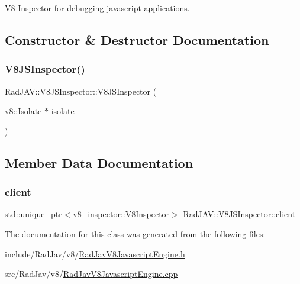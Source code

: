 V8 Inspector for debugging javascript applications. 

\subsection{Constructor \& Destructor Documentation}
\mbox{\label{class_rad_j_a_v_1_1_v8_j_s_inspector_a47fc1dc7067a49100c48a760ed7e288d}} 
\subsubsection{\texorpdfstring{V8\+J\+S\+Inspector()}{V8JSInspector()}}
{\footnotesize\ttfamily Rad\+J\+A\+V\+::\+V8\+J\+S\+Inspector\+::\+V8\+J\+S\+Inspector (\begin{DoxyParamCaption}\item[{v8\+::\+Isolate $\ast$}]{isolate }\end{DoxyParamCaption})}



\subsection{Member Data Documentation}
\mbox{\label{class_rad_j_a_v_1_1_v8_j_s_inspector_aef379a913b0a7ffb9d66e59d91d8e5f5}} 
\subsubsection{\texorpdfstring{client}{client}}
{\footnotesize\ttfamily std\+::unique\+\_\+ptr$<$v8\+\_\+inspector\+::\+V8\+Inspector$>$ Rad\+J\+A\+V\+::\+V8\+J\+S\+Inspector\+::client\hspace{0.3cm}{\ttfamily [protected]}}



The documentation for this class was generated from the following files\+:\begin{DoxyCompactItemize}
\item 
include/\+Rad\+Jav/v8/\mbox{\hyperlink{_rad_jav_v8_javascript_engine_8h}{Rad\+Jav\+V8\+Javascript\+Engine.\+h}}\item 
src/\+Rad\+Jav/v8/\mbox{\hyperlink{v8_2_rad_jav_v8_javascript_engine_8cpp}{Rad\+Jav\+V8\+Javascript\+Engine.\+cpp}}\end{DoxyCompactItemize}
